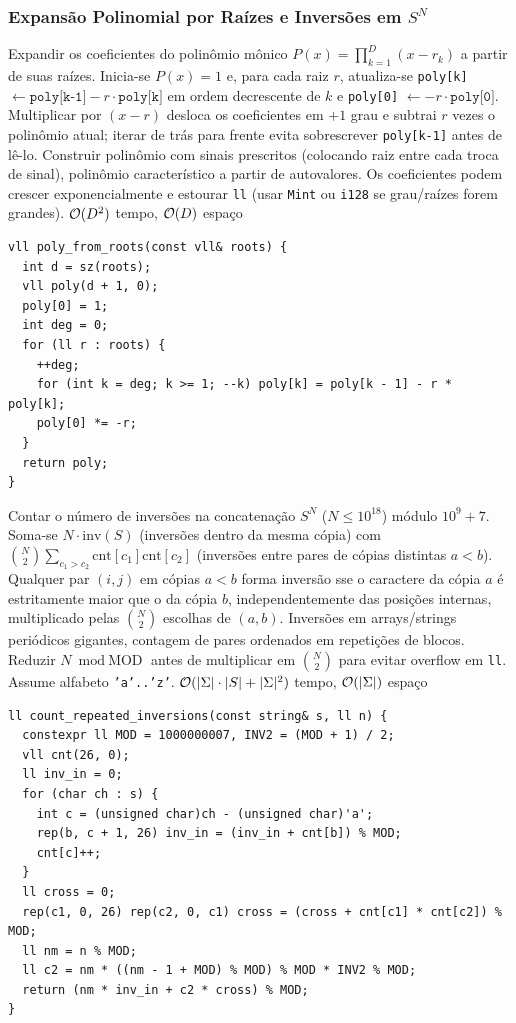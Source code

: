 \subsubsection{Expansão Polinomial por Raízes e Inversões em $S^N$}
\algobox
  {Expandir os coeficientes do polinômio mônico $P(x) = \prod_{k=1}^{D} (x - r_k)$ a partir de suas raízes.}
  {Inicia-se $P(x) = 1$ e, para cada raiz $r$, atualiza-se \texttt{poly[k]} $\leftarrow \texttt{poly[k-1]} - r \cdot \texttt{poly[k]}$ em ordem decrescente de $k$ e \texttt{poly[0]} $\leftarrow -r \cdot \texttt{poly[0]}$.}
  {Multiplicar por $(x - r)$ desloca os coeficientes em $+1$ grau e subtrai $r$ vezes o polinômio atual; iterar de trás para frente evita sobrescrever \texttt{poly[k-1]} antes de lê-lo.}
  {Construir polinômio com sinais prescritos (colocando raiz entre cada troca de sinal), polinômio característico a partir de autovalores.}
  {Os coeficientes podem crescer exponencialmente e estourar \texttt{ll} (usar \texttt{Mint} ou \texttt{i128} se grau/raízes forem grandes).}
  {$\mathcal{O}(D^2)$ tempo, $\mathcal{O}(D)$ espaço}

\begin{lstlisting}
vll poly_from_roots(const vll& roots) {
  int d = sz(roots);
  vll poly(d + 1, 0);
  poly[0] = 1;
  int deg = 0;
  for (ll r : roots) {
    ++deg;
    for (int k = deg; k >= 1; --k) poly[k] = poly[k - 1] - r * poly[k];
    poly[0] *= -r;
  }
  return poly;
}
\end{lstlisting}

\algobox
  {Contar o número de inversões na concatenação $S^N$ ($N \le 10^{18}$) módulo $10^9 + 7$.}
  {Soma-se $N \cdot \text{inv}(S)$ (inversões dentro da mesma cópia) com $\binom{N}{2} \sum_{c_1 > c_2} \text{cnt}[c_1]\text{cnt}[c_2]$ (inversões entre pares de cópias distintas $a < b$).}
  {Qualquer par $(i, j)$ em cópias $a < b$ forma inversão sse o caractere da cópia $a$ é estritamente maior que o da cópia $b$, independentemente das posições internas, multiplicado pelas $\binom{N}{2}$ escolhas de $(a, b)$.}
  {Inversões em arrays/strings periódicos gigantes, contagem de pares ordenados em repetições de blocos.}
  {Reduzir $N \bmod \text{MOD}$ antes de multiplicar em $\binom{N}{2}$ para evitar overflow em \texttt{ll}. Assume alfabeto \texttt{'a'..'z'}.}
  {$\mathcal{O}(|\Sigma|\cdot|S| + |\Sigma|^2)$ tempo, $\mathcal{O}(|\Sigma|)$ espaço}

\begin{lstlisting}
ll count_repeated_inversions(const string& s, ll n) {
  constexpr ll MOD = 1000000007, INV2 = (MOD + 1) / 2;
  vll cnt(26, 0);
  ll inv_in = 0;
  for (char ch : s) {
    int c = (unsigned char)ch - (unsigned char)'a';
    rep(b, c + 1, 26) inv_in = (inv_in + cnt[b]) % MOD;
    cnt[c]++;
  }
  ll cross = 0;
  rep(c1, 0, 26) rep(c2, 0, c1) cross = (cross + cnt[c1] * cnt[c2]) % MOD;
  ll nm = n % MOD;
  ll c2 = nm * ((nm - 1 + MOD) % MOD) % MOD * INV2 % MOD;
  return (nm * inv_in + c2 * cross) % MOD;
}
\end{lstlisting}

